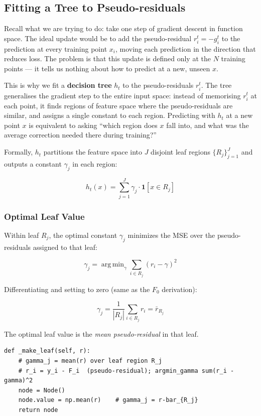 \documentclass[11pt, a4paper]{article}
\begin{document}
\subsection{Fitting a Tree to Pseudo-residuals}

Recall what we are trying to do: take one step of gradient descent in function space.
The ideal update would be to add the pseudo-residual $r_i^t = -g_i^t$ to the prediction
at every training point $x_i$, moving each prediction in the direction that reduces loss.
The problem is that this update is defined only at the $N$ training points --- it
tells us nothing about how to predict at a new, unseen $x$.

This is why we fit a \textbf{decision tree} $h_t$ to the pseudo-residuals $r_i^t$.
The tree generalises the gradient step to the entire input space: instead of
memorising $r_i^t$ at each point, it finds regions of feature space where
the pseudo-residuals are similar, and assigns a single constant to each region.
Predicting with $h_t$ at a new point $x$ is equivalent to asking
``which region does $x$ fall into, and what was the average correction
needed there during training?''

Formally, $h_t$ partitions the feature space into $J$ disjoint
leaf regions $\{R_j\}_{j=1}^J$ and outputs a constant $\gamma_j$
in each region:

\[
h_t(x) = \sum_{j=1}^J \gamma_j \cdot \mathbf{1}[x \in R_j]
\]

\subsubsection{Optimal Leaf Value}

Within leaf $R_j$, the optimal constant $\gamma_j$ minimizes the MSE
over the pseudo-residuals assigned to that leaf:

\[
\gamma_j
= \operatorname{arg\,min}_\gamma \sum_{i \in R_j} (r_i - \gamma)^2
\]

Differentiating and setting to zero (same as the $F_0$ derivation):

\[
\boxed{\gamma_j = \frac{1}{|R_j|} \sum_{i \in R_j} r_i = \bar{r}_{R_j}}
\]

The optimal leaf value is the \emph{mean pseudo-residual} in that leaf.

\begin{listing}[H]
\caption{Leaf value computation (\texttt{vanilla\_gbm.py})}
\begin{verbatim}
def _make_leaf(self, r):
    # gamma_j = mean(r) over leaf region R_j
    # r_i = y_i - F_i  (pseudo-residual); argmin_gamma sum(r_i - gamma)^2
    node = Node()
    node.value = np.mean(r)    # gamma_j = r-bar_{R_j}
    return node
\end{verbatim}
\end{listing}
\end{document}
